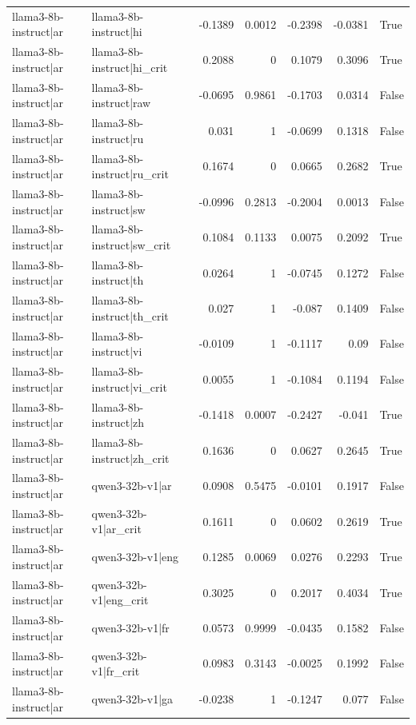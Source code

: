 \begin{table}
\begin{tabular}{l l r r r r l}
llama3-8b-instruct|ar & llama3-8b-instruct|hi & -0.1389 & 0.0012 & -0.2398 & -0.0381 & True \\
llama3-8b-instruct|ar & llama3-8b-instruct|hi_crit & 0.2088 & 0 & 0.1079 & 0.3096 & True \\
llama3-8b-instruct|ar & llama3-8b-instruct|raw & -0.0695 & 0.9861 & -0.1703 & 0.0314 & False \\
llama3-8b-instruct|ar & llama3-8b-instruct|ru & 0.031 & 1 & -0.0699 & 0.1318 & False \\
llama3-8b-instruct|ar & llama3-8b-instruct|ru_crit & 0.1674 & 0 & 0.0665 & 0.2682 & True \\
llama3-8b-instruct|ar & llama3-8b-instruct|sw & -0.0996 & 0.2813 & -0.2004 & 0.0013 & False \\
llama3-8b-instruct|ar & llama3-8b-instruct|sw_crit & 0.1084 & 0.1133 & 0.0075 & 0.2092 & True \\
llama3-8b-instruct|ar & llama3-8b-instruct|th & 0.0264 & 1 & -0.0745 & 0.1272 & False \\
llama3-8b-instruct|ar & llama3-8b-instruct|th_crit & 0.027 & 1 & -0.087 & 0.1409 & False \\
llama3-8b-instruct|ar & llama3-8b-instruct|vi & -0.0109 & 1 & -0.1117 & 0.09 & False \\
llama3-8b-instruct|ar & llama3-8b-instruct|vi_crit & 0.0055 & 1 & -0.1084 & 0.1194 & False \\
llama3-8b-instruct|ar & llama3-8b-instruct|zh & -0.1418 & 0.0007 & -0.2427 & -0.041 & True \\
llama3-8b-instruct|ar & llama3-8b-instruct|zh_crit & 0.1636 & 0 & 0.0627 & 0.2645 & True \\
llama3-8b-instruct|ar & qwen3-32b-v1|ar & 0.0908 & 0.5475 & -0.0101 & 0.1917 & False \\
llama3-8b-instruct|ar & qwen3-32b-v1|ar_crit & 0.1611 & 0 & 0.0602 & 0.2619 & True \\
llama3-8b-instruct|ar & qwen3-32b-v1|eng & 0.1285 & 0.0069 & 0.0276 & 0.2293 & True \\
llama3-8b-instruct|ar & qwen3-32b-v1|eng_crit & 0.3025 & 0 & 0.2017 & 0.4034 & True \\
llama3-8b-instruct|ar & qwen3-32b-v1|fr & 0.0573 & 0.9999 & -0.0435 & 0.1582 & False \\
llama3-8b-instruct|ar & qwen3-32b-v1|fr_crit & 0.0983 & 0.3143 & -0.0025 & 0.1992 & False \\
llama3-8b-instruct|ar & qwen3-32b-v1|ga & -0.0238 & 1 & -0.1247 & 0.077 & False \\

\end{tabular}
\end{table}
